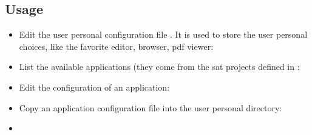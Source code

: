 \documentclass[a4paper,10pt,english]{sphinxmanual}
\begin{document}
\subsection{Usage}
\label{\detokenize{commands/config:usage}}\begin{itemize}
\item {} 
Edit the user personal configuration file . It is used to store the user personal choices, like the favorite editor, browser, pdf viewer:

%
\begin{sphinxVerbatim}[commandchars=\\\{\}]
  
\end{sphinxVerbatim}

\item {} 
List the available applications (they come from the sat projects defined in :

%
\begin{sphinxVerbatim}[commandchars=\\\{\}]
  
\end{sphinxVerbatim}

\item {} 
Edit the configuration of an application:

%
\begin{sphinxVerbatim}[commandchars=\\\{\}]
   
\end{sphinxVerbatim}

\item {} 
Copy an application configuration file into the user personal directory:

%
\begin{sphinxVerbatim}[commandchars=\\\{\}]
    \PYG{p}{[}\PYG{p}{]}
\end{sphinxVerbatim}

\item {} 


\end{itemize}
\end{document}
